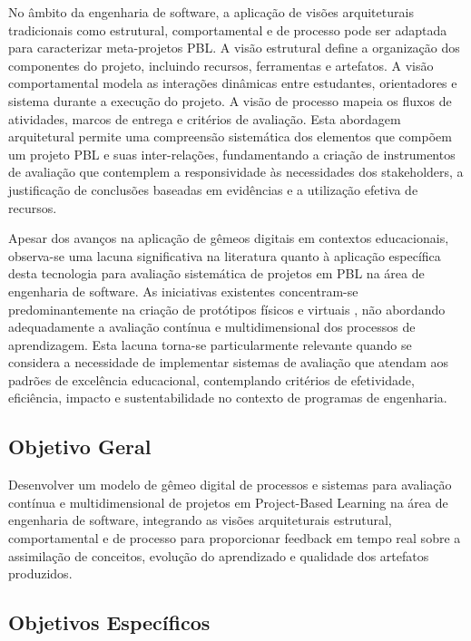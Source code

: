 \documentclass[12pt,a4paper]{article}
\begin{document}
No âmbito da engenharia de software, a aplicação de visões arquiteturais tradicionais como estrutural, comportamental e de processo pode ser adaptada para caracterizar meta-projetos PBL. A visão estrutural define a organização dos componentes do projeto, incluindo recursos, ferramentas e artefatos. A visão comportamental modela as interações dinâmicas entre estudantes, orientadores e sistema durante a execução do projeto. A visão de processo mapeia os fluxos de atividades, marcos de entrega e critérios de avaliação. Esta abordagem arquitetural permite uma compreensão sistemática dos elementos que compõem um projeto PBL e suas inter-relações, fundamentando a criação de instrumentos de avaliação que contemplem a responsividade às necessidades dos stakeholders, a justificação de conclusões baseadas em evidências e a utilização efetiva de recursos.

Apesar dos avanços na aplicação de gêmeos digitais em contextos educacionais, observa-se uma lacuna significativa na literatura quanto à aplicação específica desta tecnologia para avaliação sistemática de projetos em PBL na área de engenharia de software. As iniciativas existentes concentram-se predominantemente na criação de protótipos físicos e virtuais \cite{bachmann2023}, não abordando adequadamente a avaliação contínua e multidimensional dos processos de aprendizagem. Esta lacuna torna-se particularmente relevante quando se considera a necessidade de implementar sistemas de avaliação que atendam aos padrões de excelência educacional, contemplando critérios de efetividade, eficiência, impacto e sustentabilidade no contexto de programas de engenharia.

\subsection{Objetivo Geral}

Desenvolver um modelo de gêmeo digital de processos e sistemas para avaliação contínua e multidimensional de projetos em Project-Based Learning na área de engenharia de software, integrando as visões arquiteturais estrutural, comportamental e de processo para proporcionar feedback em tempo real sobre a assimilação de conceitos, evolução do aprendizado e qualidade dos artefatos produzidos.

\subsection{Objetivos Específicos}
\end{document}
